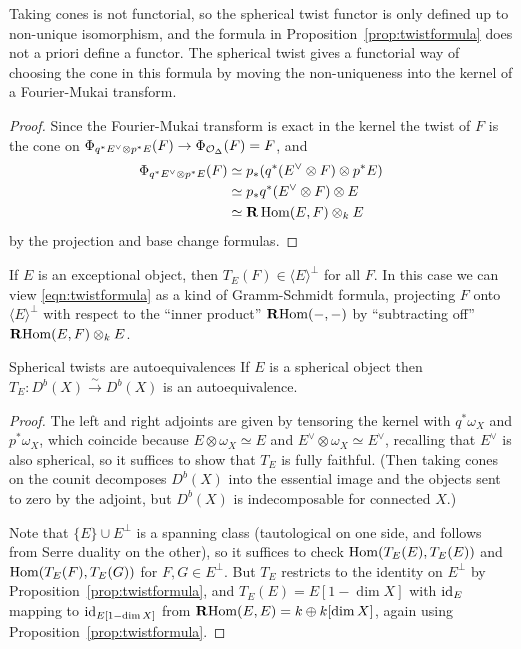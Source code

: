 \begin{remark}{}{}
    Taking cones is not functorial, so the spherical twist functor is only
    defined up to non-unique isomorphism, and the formula in
    Proposition~\ref{prop:twistformula} does not a priori define a functor. The
    spherical twist gives a functorial way of choosing the cone in this formula
    by moving the non-uniqueness into the kernel of a Fourier-Mukai transform.
\end{remark}

\begin{proof}
    Since the Fourier-Mukai transform is exact in the kernel the twist of $F$
    is the cone on $\Phi_{q^*E^\vee\otimes p^*E}(F)\to\Phi_{\mathcal{O}_\Delta}(F)=F$,
    and
    \begin{align*}
        \Phi_{q^*E^\vee\otimes p^*E}(F)
            &\simeq p_*(q^*(E^\vee\otimes F)\otimes p^*E) \\
            &\simeq p_*q^*(E^\vee\otimes F)\otimes E \\
            &\simeq \operatorname{\mathbf{R}}\operatorname{Hom}(E,F)\otimes_kE
    \end{align*}
    by the projection and base change formulas.
\end{proof}

\begin{remark}{}{}
    If $E$ is an exceptional object, then $T_E(F)\in\langle E\rangle^\perp$ for
    all $F$. In this case we can view \eqref{eqn:twistformula} as a kind of
    Gramm-Schmidt formula, projecting $F$ onto $\langle E\rangle^\perp$ with
    respect to the ``inner product'' $\operatorname{\mathbf{R}Hom}(-,-)$ by ``subtracting off''
    $\operatorname{\mathbf{R}Hom}(E,F)\otimes_kE$. %
\end{remark}

\begin{proposition}{Spherical twists are autoequivalences}{}
    If $E$ is a spherical object then $T_E:D^b(X)\xrightarrow\sim D^b(X)$ is an
    autoequivalence.
\end{proposition}

\begin{proof}
    The left and right adjoints are given by tensoring the kernel with
    $q^*\omega_X$ and $p^*\omega_X$, which coincide because
    $E\otimes\omega_X\simeq E$ and $E^\vee\otimes\omega_X\simeq E^\vee$,
    recalling that $E^\vee$ is also spherical, so it suffices to show that
    $T_E$ is fully faithful. (Then taking cones on the counit decomposes
    $D^b(X)$ into the essential image and the objects sent to zero by the
    adjoint, but $D^b(X)$ is indecomposable for connected $X$.)

    Note that $\{E\}\cup E^\perp$ is a spanning class (tautological on one side,
    and follows from Serre duality on the other), so it suffices to check
    $\operatorname{Hom}(T_E(E),T_E(E))$ and $\operatorname{Hom}(T_E(F),T_E(G))$ for $F,G\in E^\perp$. But
    $T_E$ restricts to the identity on $E^\perp$ by
    Proposition~\ref{prop:twistformula}, and $T_E(E)=E[1-\dim X]$ with $\mathrm{id}_E$
    mapping to $\mathrm{id}_{E[1-\dim X]}$ from $\operatorname{\mathbf{R}Hom}(E,E)=k\oplus k[\dim X]$, again
    using Proposition~\ref{prop:twistformula}.
\end{proof}

